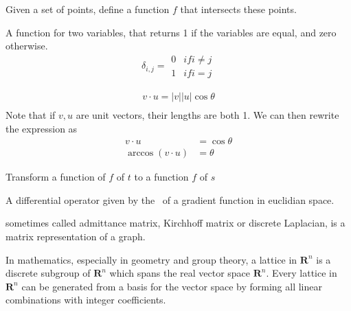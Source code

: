 \begin{definition}[Flow]
\begin{definition}
    Given a set of points, define a function $f$ that intersects these points.
\end{definition}

\begin{definition}
    A function for two variables, that returns 1 if the variables are equal,
    and zero otherwise.
    $$
    \delta_{i,j} = \begin{array}{ll}
        0 & if i \neq j \\
        1 & if i = j
        \end{array}
    $$
\end{definition}

\begin{definition}
    \begin{align*}
        v \cdot u = |v||u|\cos{\theta} \\
    \end{align*}
    Note that if $v, u$ are unit vectors, their lengths are both 1.
    We can then rewrite the expression as
    \begin{align*}
        v \cdot u &= \cos{\theta} \\
        \arccos{(v \cdot u)} &= \theta
    \end{align*}
\end{definition}

\begin{definition}
    Transform a function of $f$ of $t$ to a function $f$ of $s$

    A differential operator given by the~ of a gradient 
    function in euclidian space.
\end{definition}

\begin{definition}
    sometimes called admittance matrix, Kirchhoff matrix or discrete Laplacian,
    is a matrix representation of a graph.

\end{definition}

\begin{definition}[Lattice]
    In mathematics, especially in geometry and group theory, a lattice in
    $\mathbf{R}^n$ is a discrete subgroup of $\mathbf{R}^n$ which spans the real
    vector space $\mathbf{R}^n$. Every lattice in $\mathbf{R}^n$ can be generated
    from a basis for the vector space by forming all linear combinations with
    integer coefficients. 


\end{definition}
\end{definition}
